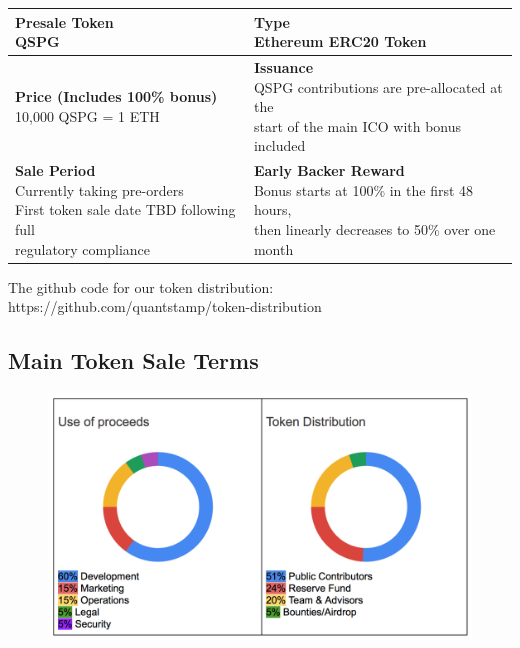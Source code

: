 \documentclass[final,smallcondensed]{llncs}
\begin{document}
\begin{table}[]
\begin{tabular}{| l | l |}
\hline
\makecell[lt]{\textbf{Presale Token}\\QSPG} & \makecell[lt]{\textbf{Type}\\Ethereum ERC20 Token} \\ \hline
\makecell[lt]{\textbf{Price (Includes 100\% bonus)}\\10,000 QSPG = 1 ETH} & \makecell[lt]{\textbf{Issuance} \\QSPG contributions are pre-allocated at the\\start of the main ICO with bonus included} \\ \hline
\makecell[lt]{\textbf{Sale Period}\\Currently taking pre-orders\\First token sale date TBD following full \\regulatory compliance
} & \makecell[lt]{\textbf{Early Backer Reward}\\Bonus starts at 100\% in the first 48 hours,\\then linearly decreases to 50\% over one\\month} \\ \hline
\end{tabular}
\end{table}

\noindent The github code for our token distribution: https://github.com/quantstamp/token-distribution

\subsection{Main Token Sale Terms}

\begin{figure}[h!]
  \includegraphics[scale=0.45]{token_sale.png}
\end{figure}
\end{document}
